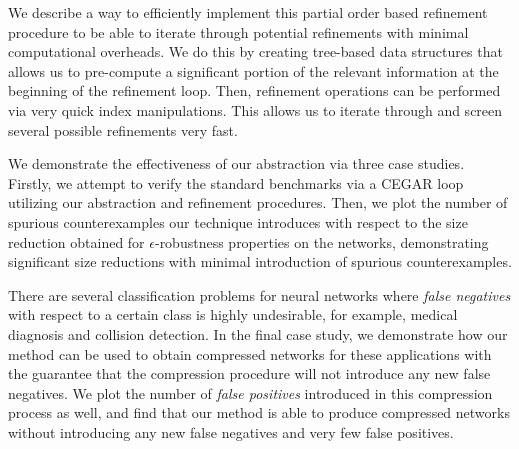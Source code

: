 
We describe a way to efficiently implement this partial order based refinement
procedure to be able to iterate through potential refinements with minimal
computational overheads. We do this by creating tree-based data structures that
allows us to pre-compute a significant portion of the relevant information at
the beginning of the refinement loop. Then, refinement operations can be
performed via very quick index manipulations. This allows us to iterate through
and screen several possible refinements very fast. 

We demonstrate the effectiveness of our abstraction via three case studies.
Firstly, we attempt to verify the standard \acasxu benchmarks via a CEGAR loop
utilizing our abstraction and refinement procedures.  Then, we plot the number of spurious counterexamples our technique
introduces with respect to the size reduction obtained for $\epsilon$-robustness
properties on the \mnist networks, demonstrating significant size reductions
with minimal introduction of spurious counterexamples. 

There are several classification problems for neural networks where
\textit{false negatives} with respect to a certain class is highly undesirable,
for example,
medical diagnosis and collision detection. In the final case study, we
demonstrate how our method can be used to obtain compressed networks for these
applications with the guarantee that the compression procedure will not
introduce any new false negatives. We plot the number of \textit{false
positives} introduced in this compression process as well, and find that our
method is able to produce compressed networks without introducing any new false
negatives and very few false positives. 


